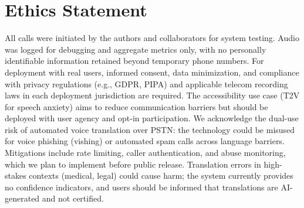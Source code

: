 \documentclass[11pt]{article}
\begin{document}
\clearpage
\section*{Ethics Statement}

All calls were initiated by the authors and collaborators for system testing. Audio was logged for debugging and aggregate metrics only, with no personally identifiable information retained beyond temporary phone numbers. For deployment with real users, informed consent, data minimization, and compliance with privacy regulations (e.g., GDPR, PIPA) and applicable telecom recording laws in each deployment jurisdiction are required. The accessibility use case (T2V for speech anxiety) aims to reduce communication barriers but should be deployed with user agency and opt-in participation. We acknowledge the dual-use risk of automated voice translation over PSTN: the technology could be misused for voice phishing (vishing) or automated spam calls across language barriers. Mitigations include rate limiting, caller authentication, and abuse monitoring, which we plan to implement before public release. Translation errors in high-stakes contexts (medical, legal) could cause harm; the system currently provides no confidence indicators, and users should be informed that translations are AI-generated and not certified.


\end{document}

